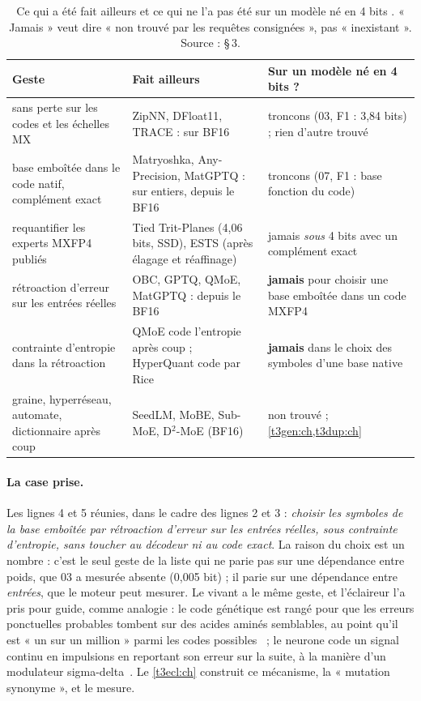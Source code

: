 \begin{table}[tbp]
\centering\small
\begin{tabularx}{\linewidth}{>{\raggedright\arraybackslash}X >{\raggedright\arraybackslash}X >{\raggedright\arraybackslash}X}
\toprule
Geste & Fait ailleurs & Sur un modèle né en 4 bits ? \\
\midrule
sans perte sur les codes et les échelles MX & ZipNN, DFloat11, TRACE : sur BF16 & troncons (03, F1 : 3,84 bits) ; rien d'autre trouvé \\
base emboîtée dans le code natif, complément exact & Matryoshka, Any-Precision, MatGPTQ : sur entiers, depuis le BF16 & troncons (07, F1 : base fonction du code) \\
requantifier les experts MXFP4 publiés & Tied Trit-Planes (4,06 bits, SSD), ESTS (après élagage et réaffinage) & jamais \emph{sous} 4 bits avec un complément exact \\
rétroaction d'erreur sur les entrées réelles & OBC, GPTQ, QMoE, MatGPTQ : depuis le BF16 & \textbf{jamais} pour choisir une base emboîtée dans un code MXFP4 \\
contrainte d'entropie dans la rétroaction & QMoE code l'entropie après coup ; HyperQuant code par Rice & \textbf{jamais} dans le choix des symboles d'une base native \\
graine, hyperréseau, automate, dictionnaire après coup & SeedLM, MoBE, Sub-MoE, D$^2$-MoE (BF16) & non trouvé ; \cref{t3gen:ch,t3dup:ch} \\
\bottomrule
\end{tabularx}
\caption[La case vide]{Ce qui a été fait ailleurs et ce qui ne l'a pas été sur un modèle né en 4 bits \litt. « Jamais » veut dire « non trouvé par les requêtes consignées », pas « inexistant ». Source :  §\,3.}
\label{t3que:tab:case}
\end{table}

\paragraph{La case prise.} Les lignes 4 et 5 réunies, dans le cadre des lignes 2 et 3 : \emph{choisir les symboles de la base emboîtée par rétroaction d'erreur sur les entrées réelles, sous contrainte d'entropie, sans toucher au décodeur ni au code exact}. La raison du choix est un nombre : c'est le seul geste de la liste qui ne parie pas sur une dépendance entre poids, que 03 a mesurée absente (0,005 bit) ; il parie sur une dépendance entre \emph{entrées}, que le moteur peut mesurer. Le vivant a le même geste, et l'éclaireur l'a pris pour guide, comme analogie : le code génétique est rangé pour que les erreurs ponctuelles probables tombent sur des acides aminés semblables, au point qu'il est « un sur un million » parmi les codes possibles~\cite{freeland1998} ; le neurone code un signal continu en impulsions en reportant son erreur sur la suite, à la manière d'un modulateur sigma-delta~\cite{yoon2017sigmadelta}. Le \cref{t3ecl:ch} construit ce mécanisme, la « mutation synonyme », et le mesure.


